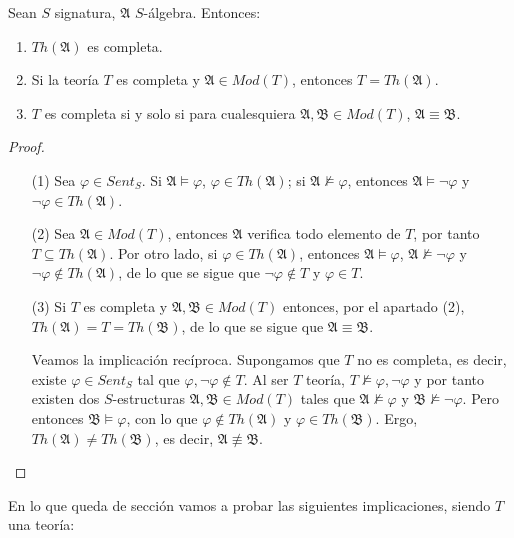 \begin{prop}\label{complet}
Sean $S$ signatura, $\mathfrak{A}$ $S$-álgebra. Entonces:
\begin{enumerate}
    \item $Th(\mathfrak{A})$ es completa.
    \item Si la teoría $T$ es completa y $\mathfrak{A} \in Mod(T)$, entonces $T = Th(\mathfrak{A})$.
    \item $T$ es completa si y solo si para cualesquiera $\mathfrak{A}, \mathfrak{B} \in Mod(T)$, $\mathfrak{A} \equiv \mathfrak{B}$.
\end{enumerate}
\end{prop}
\begin{proof}\mbox{}
\begin{itemize}
    \item[(1)] Sea $\varphi \in Sent_S$. Si $\mathfrak{A}\vDash \varphi$, $\varphi \in Th(\mathfrak{A})$; si $\mathfrak{A} \nvDash \varphi$, entonces $\mathfrak{A} \vDash \neg \varphi$ y $\neg \varphi\in Th(\mathfrak{A})$.
    \item[(2)] Sea $\mathfrak{A} \in Mod(T)$, entonces $\mathfrak{A}$ verifica todo elemento de $T$, por tanto $T \subseteq Th(\mathfrak{A})$. Por otro lado, si $\varphi \in Th(\mathfrak{A})$, entonces $\mathfrak{A} \vDash \varphi$, $\mathfrak{A} \nvDash \neg \varphi$ y $\neg \varphi \notin Th(\mathfrak{A})$, de lo que se sigue que $\neg\varphi \notin T$ y $\varphi \in T$.
    \item[(3)] Si $T$ es completa y $\mathfrak{A}, \mathfrak{B} \in Mod(T)$ entonces, por el apartado (2), $Th(\mathfrak{A}) = T = Th(\mathfrak{B})$, de lo que se sigue que $\mathfrak{A} \equiv \mathfrak{B}$.
    
    Veamos la implicación recíproca. Supongamos que $T$ no es completa, es decir, existe $\varphi \in Sent_S$ tal que $\varphi, \neg\varphi \notin T$. Al ser $T$ teoría, $T \nvDash \varphi, \neg\varphi$ y por tanto existen dos $S$-estructuras $\mathfrak{A}, \mathfrak{B} \in Mod(T)$ tales que $\mathfrak{A} \nvDash \varphi$ y $\mathfrak{B}\nvDash \neg\varphi$. Pero entonces $\mathfrak{B}\vDash \varphi$, con lo que $\varphi \notin Th(\mathfrak{A})$ y $\varphi \in Th(\mathfrak{B})$. Ergo, $Th(\mathfrak{A})\neq Th(\mathfrak{B})$, es decir, $\mathfrak{A} \not\equiv \mathfrak{B}$.
\end{itemize}
\end{proof}

En lo que queda de sección vamos a probar las siguientes implicaciones, siendo $T$ una teoría:

